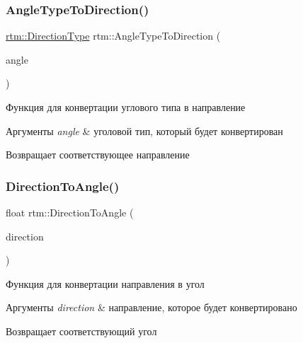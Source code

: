 \subsubsection{\texorpdfstring{Angle\+Type\+To\+Direction()}{AngleTypeToDirection()}}
{\footnotesize\ttfamily \hyperlink{namespacertm_a57b216f3aeb45041f3461bab08bc3aeb}{rtm\+::\+Direction\+Type} rtm\+::\+Angle\+Type\+To\+Direction (\begin{DoxyParamCaption}\item[{\hyperlink{namespacertm_a69dc82b16a0148c10962caa83d930f89}{Angle\+Type}}]{angle }\end{DoxyParamCaption})}

Функция для конвертации углового типа в направление 
\begin{DoxyParams}{Аргументы}
{\em angle} & уголовой тип, который будет конвертирован \\
\hline
\end{DoxyParams}
\begin{DoxyReturn}{Возвращает}
соответствующее направление 
\end{DoxyReturn}
\mbox{\label{namespacertm_a173759dd130d0f30d1f90fba11506bd6}} 
\subsubsection{\texorpdfstring{Direction\+To\+Angle()}{DirectionToAngle()}}
{\footnotesize\ttfamily float rtm\+::\+Direction\+To\+Angle (\begin{DoxyParamCaption}\item[{\hyperlink{namespacertm_a57b216f3aeb45041f3461bab08bc3aeb}{Direction\+Type}}]{direction }\end{DoxyParamCaption})}

Функция для конвертации направления в угол 
\begin{DoxyParams}{Аргументы}
{\em direction} & направление, которое будет конвертировано \\
\hline
\end{DoxyParams}
\begin{DoxyReturn}{Возвращает}
соответствующий угол 
\end{DoxyReturn}
\mbox{\label{namespacertm_aa37fca29e3577b3389a9e8eb40d20d14}} 
